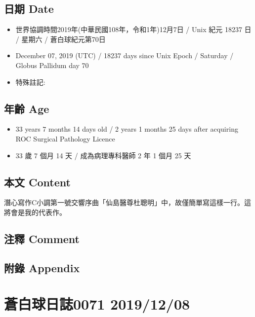 \documentclass[
]{article}
\providecommand{\tightlist}{%
  \setlength{\itemsep}{0pt}\setlength{\parskip}{0pt}}
\begin{document}
\hypertarget{ux65e5ux671f-date-6}{%
\subsection{日期 Date}\label{ux65e5ux671f-date-6}}

\begin{itemize}
\tightlist
\item
  世界協調時間2019年(中華民國108年，令和1年)12月7日 / Unix 紀元 18237 日
  / 星期六 / 蒼白球紀元第70日
\item
  December 07, 2019 (UTC) / 18237 days since Unix Epoch / Saturday /
  Globus Pallidum day 70
\item
  特殊註記:
\end{itemize}

\hypertarget{ux5e74ux9f61-age-6}{%
\subsection{年齡 Age}\label{ux5e74ux9f61-age-6}}

\begin{itemize}
\tightlist
\item
  33 years 7 months 14 days old / 2 years 1 months 25 days after
  acquiring ROC Surgical Pathology Licence
\item
  33 歲 7 個月 14 天 / 成為病理專科醫師 2 年 1 個月 25 天
\end{itemize}

\hypertarget{ux672cux6587-content-6}{%
\subsection{本文 Content}\label{ux672cux6587-content-6}}

潛心寫作C小調第一號交響序曲「仙島醫尊杜聰明」中，故僅簡單寫這樣一行。這將會是我的代表作。

\hypertarget{ux6ce8ux91cb-comment-6}{%
\subsection{注釋 Comment}\label{ux6ce8ux91cb-comment-6}}

\hypertarget{ux9644ux9304-appendix-6}{%
\subsection{附錄 Appendix}\label{ux9644ux9304-appendix-6}}

\hypertarget{ux84bcux767dux7403ux65e5ux8a8c0071-20191208}{%
\section{蒼白球日誌0071
2019/12/08}\label{ux84bcux767dux7403ux65e5ux8a8c0071-20191208}}
\end{document}
